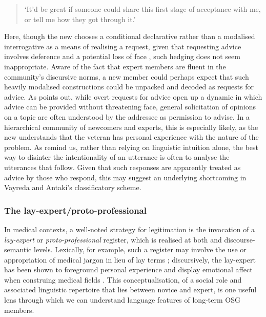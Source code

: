 \begin{quote}\small\singlespacing
`It'd be great if someone could share this first stage of acceptance with me, or tell me how they got through it.' \parencite*[p.~11]{vayreda_social_2009}
\end{quote} 
%
\noindent Here, though the new  chooses a conditional declarative rather than a modalised interrogative as a means of realising a request, given that requesting advice involves deference and a potential loss of face \cite{brown_politeness:_1987}, such hedging does not seem inappropriate. Aware of the fact that expert \glspl{member} are fluent in the community's discursive norms, a new member could perhaps expect that such heavily modalised constructions could be unpacked and decoded as requests for advice. As \textcite{goldsmith2000soliciting} points out, while overt requests for advice open up a dynamic in which advice can be provided without threatening face, general solicitation of opinions on a topic are often understood by the addressee as permission to advise. In a hierarchical community of newcomers and experts, this is especially likely, as the new  understands that the veteran has personal experience with the nature of the problem. As \textcite{eggins_analysing_2004} remind us, rather than relying on linguistic intuition alone, the best way to disinter the intentionality of an utterance is often to analyse the utterances that follow. Given that such responses are apparently treated as advice by those who respond, this may suggest an underlying shortcoming in Vayreda and Antaki's classificatory scheme.

\subsubsection{The lay-expert\slash proto-professional}

In medical contexts, a well\hyp{}noted strategy for legitimation is the invocation of a \emph{lay\hyp{}expert} or \emph{proto\hyp{}professional} register, which is realised at both  and \gls{discourse-semantic} levels. Lexically, for example, such a register may involve the use or appropriation of medical jargon in lieu of lay terms \cite{harvey_disclosures_2012,sullivan_gendered_2003}; discursively, the lay\hyp{}expert has been shown to foreground personal experience and display emotional affect when construing medical fields \cite{wilson_expert_2007}. This conceptualisation, of a social role and associated linguistic repertoire that lies between novice and expert, is one useful lens through which we can understand language features of long\hyp{}term \gls{OSG} members.

